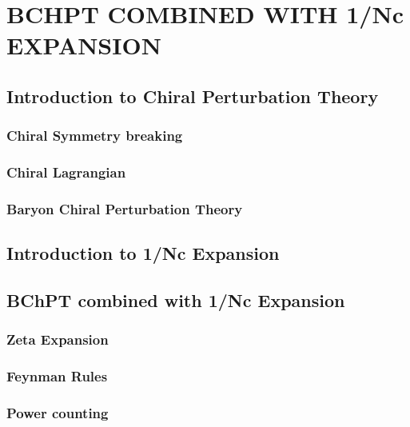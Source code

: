 \chapter{BCHPT COMBINED WITH 1/Nc EXPANSION}

\section{Introduction to Chiral Perturbation Theory}

\subsection{Chiral Symmetry breaking}
\subsection{Chiral Lagrangian}
\subsection{Baryon Chiral Perturbation Theory}




\section{Introduction to 1/Nc Expansion}


\section{BChPT combined with 1/Nc Expansion}

\subsection{Zeta Expansion}
\subsection{Feynman Rules}
\subsection{Power counting}



\newpage